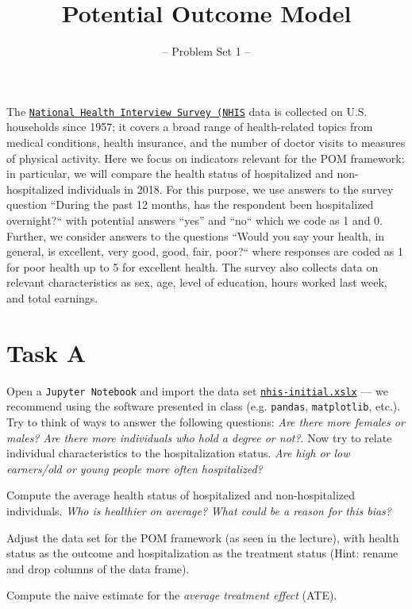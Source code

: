 

\title{Potential Outcome Model}
\subtitle{-- Problem Set 1 --}
\date{}

\maketitle\vspace{-2cm}

The \href{https://www.cdc.gov/nchs/nhis/index.htm}{\texttt{National Health Interview Survey (NHIS}} data is collected on U.S. households since 1957; it covers a broad range of health-related topics from medical conditions, health insurance, and the number of doctor visits to measures of physical activity. Here we focus on indicators relevant for the POM framework; in particular, we will compare the health status of hospitalized and non-hospitalized individuals in 2018.
For this purpose, we use answers to the survey question ``During the past 12 months, has the respondent been hospitalized overnight?`` with potential answers ``yes'' and ``no`` which we code as 1 and 0. Further, we consider answers to the questions ``Would you say your health, in general, is excellent, very good, good, fair, poor?`` where responses are coded as 1 for poor health up to 5 for excellent health. The survey also collects data on relevant characteristics as sex, age, level of education, hours worked last week, and total earnings.

\section*{Task A} 

\begin{boenumerate}

  \item Open a \texttt{Jupyter Notebook} and import the data set \href{https://github.com/HumanCapitalAnalysis/microeconometrics/tree/peisenha_integration_problem_set/problem-sets/01-potential-outcome-model/data}{\texttt{nhis-initial.xslx}} --- we recommend using the software presented in class (e.g. \texttt{pandas}, \texttt{matplotlib}, etc.). Try to think of ways to answer the following questions: \emph{Are there more females or males?} \emph{Are there more individuals who hold a degree or not?}. Now try to relate individual characteristics to the hospitalization status. \emph{Are high or low earners/old or young people more often hospitalized?}

  \item Compute the average health status of hospitalized and non-hospitalized individuals. \emph{Who is healthier on average?} \emph{What could be a reason for this bias?}

  \item Adjust the data set for the POM framework (as seen in the lecture), with health status as the outcome and hospitalization as the treatment status (Hint: rename and drop columns of the data frame).

  \item Compute the naive estimate for the \emph{average treatment effect} (ATE).

\end{boenumerate}



